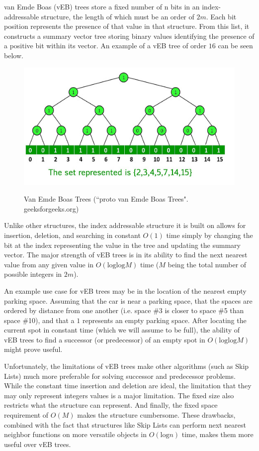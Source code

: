 \documentclass{article}
\begin{document}
van Emde Boas (vEB) trees store a fixed number of n bits in an index-addressable structure, the length of which must be an order of $2m$. Each bit position represents the presence of that value in that structure. From this list, it constructs a summary vector tree storing binary values identifying the presence of a positive bit within its vector. An example of a vEB tree of order $16$ can be seen below.

\begin{figure}[h]
    \centering
    \includegraphics[scale=0.5,keepaspectratio]{Images/vebtree.jpg}
    \label{fig:veb_tree}
    \caption{Van Emde Boas Trees (``proto van Emde Boas Trees". geeksforgeeks.org)}
\end{figure}

Unlike other structures, the index addressable structure it is built on allows for insertion, deletion, and searching in constant $O(1)$ time simply by changing the bit at the index representing the value in the tree and updating the summary vector. The major strength of vEB trees is in its ability to find the next nearest value from any given value in $O(\text{log}\text{log} M)$ time ($M$ being the total number of possible integers in $2m$).

An example use case for vEB trees may be in the location of the nearest empty parking space. Assuming that the car is near a parking space, that the spaces are ordered by distance from one another (i.e. space \#3 is closer to space \#5 than space \#10), and that a $1$ represents an empty parking space. After locating the current spot in constant time (which we will assume to be full), the ability of vEB trees to find a successor (or predecessor) of an empty spot in $O(\text{log}\text{log} M)$ might prove useful.

Unfortunately, the limitations of vEB trees make other algorithms (such as Skip Lists) much more preferable for solving successor and predecessor problems. While the constant time insertion and deletion are ideal, the limitation that they may only represent integers values is a major limitation. The fixed size also restricts what the structure can represent. And finally, the fixed space requirement of $O(M)$ makes the structure cumbersome. These drawbacks, combined with the fact that structures like Skip Lists can perform next nearest neighbor functions on more versatile objects in $O(\text{log} n)$ time, makes them more useful over vEB trees.
\end{document}
